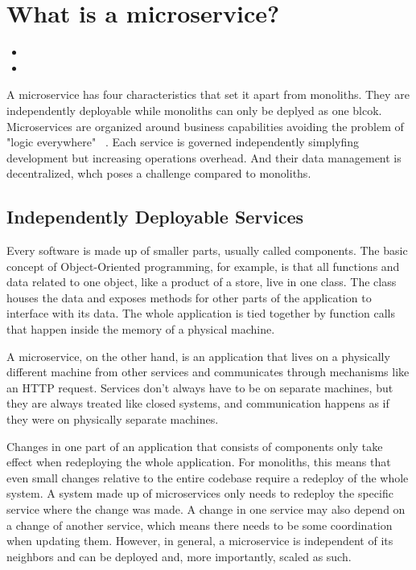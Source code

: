 \section{What is a microservice?}


\begin{itemize}
  \item {}
  \item {}
\end{itemize}

A microservice has four characteristics that set it apart from monoliths. They are independently deployable while monoliths can only be deplyed as one blcok. Microservices are organized around business capabilities avoiding the problem of "logic everywhere" ~\cite{microservices.2014}. Each service is governed independently simplyfing development but increasing operations overhead. And their data management is decentralized, whch poses a challenge compared to monoliths.

\subsection{Independently Deployable Services}

Every software is made up of smaller parts, usually called components. The basic concept of Object-Oriented programming, for example, is that all functions and data related to one object, like a product of a store, live in one class. The class houses the data and exposes methods for other parts of the application to interface with its data. The whole application is tied together by function calls that happen inside the memory of a physical machine.

A microservice, on the other hand, is an application that lives on a physically different machine from other services and communicates through mechanisms like an HTTP request. Services don't always have to be on separate machines, but they are always treated like closed systems, and communication happens as if they were on physically separate machines.

Changes in one part of an application that consists of components only take effect when redeploying the whole application. For monoliths, this means that even small changes relative to the entire codebase require a redeploy of the whole system. A system made up of microservices only needs to redeploy the specific service where the change was made. A change in one service may also depend on a change of another service, which means there needs to be some coordination when updating them. However, in general, a microservice is independent of its neighbors and can be deployed and, more importantly, scaled as such.


